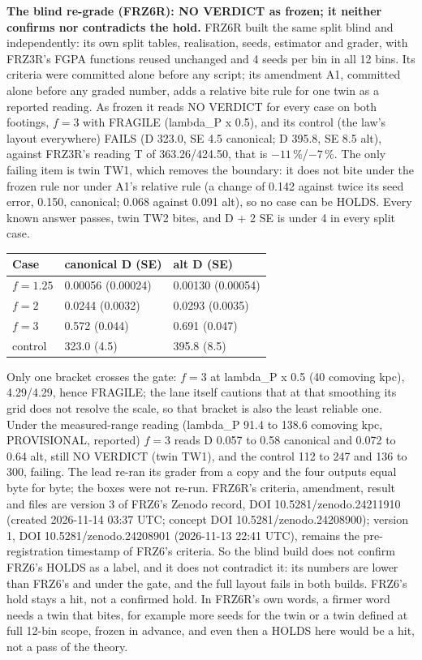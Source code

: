 \documentclass[10pt]{article}
\begin{document}
\textbf{The blind re-grade (FRZ6R): NO VERDICT as frozen; it neither confirms nor contradicts the hold.} FRZ6R built the same split blind and independently: its own split tables, realisation, seeds, estimator and grader, with FRZ3R's FGPA functions reused unchanged and 4 seeds per bin in all 12 bins. Its criteria were committed alone before any script; its amendment A1, committed alone before any graded number, adds a relative bite rule for one twin as a reported reading. As frozen it reads NO VERDICT for every case on both footings, $f=3$ with FRAGILE (lambda\_P x 0.5), and its control (the law's layout everywhere) FAILS (D 323.0, SE 4.5 canonical; D 395.8, SE 8.5 alt), against FRZ3R's reading T of 363.26/424.50, that is $-11$\,\%/$-7$\,\%. The only failing item is twin TW1, which removes the boundary: it does not bite under the frozen rule nor under A1's relative rule (a change of 0.142 against twice its seed error, 0.150, canonical; 0.068 against 0.091 alt), so no case can be HOLDS. Every known answer passes, twin TW2 bites, and D + 2 SE is under 4 in every split case.
{\small
\begin{longtable}{@{}p{3.0cm}p{3.0cm}p{3.0cm}@{}}\toprule
Case & canonical D (SE) & alt D (SE)\\\midrule\endhead
$f=1.25$ & 0.00056 (0.00024) & 0.00130 (0.00054)\\
$f=2$ & 0.0244 (0.0032) & 0.0293 (0.0035)\\
$f=3$ & 0.572 (0.044) & 0.691 (0.047)\\
control & 323.0 (4.5) & 395.8 (8.5)\\\bottomrule
\end{longtable}}
Only one bracket crosses the gate: $f=3$ at lambda\_P x 0.5 (40 comoving kpc), 4.29/4.29, hence FRAGILE; the lane itself cautions that at that smoothing its grid does not resolve the scale, so that bracket is also the least reliable one. Under the measured-range reading (lambda\_P 91.4 to 138.6 comoving kpc, PROVISIONAL, reported) $f=3$ reads D 0.057 to 0.58 canonical and 0.072 to 0.64 alt, still NO VERDICT (twin TW1), and the control 112 to 247 and 136 to 300, failing. The lead re-ran its grader from a copy and the four outputs equal byte for byte; the boxes were not re-run. FRZ6R's criteria, amendment, result and files are version 3 of FRZ6's Zenodo record, DOI 10.5281/zenodo.24211910 (created 2026-11-14 03:37 UTC; concept DOI 10.5281/zenodo.24208900); version 1, DOI 10.5281/zenodo.24208901 (2026-11-13 22:41 UTC), remains the pre-registration timestamp of FRZ6's criteria. So the blind build does not confirm FRZ6's HOLDS as a label, and it does not contradict it: its numbers are lower than FRZ6's and under the gate, and the full layout fails in both builds. FRZ6's hold stays a hit, not a confirmed hold. In FRZ6R's own words, a firmer word needs a twin that bites, for example more seeds for the twin or a twin defined at full 12-bin scope, frozen in advance, and even then a HOLDS here would be a hit, not a pass of the theory.
\end{document}
